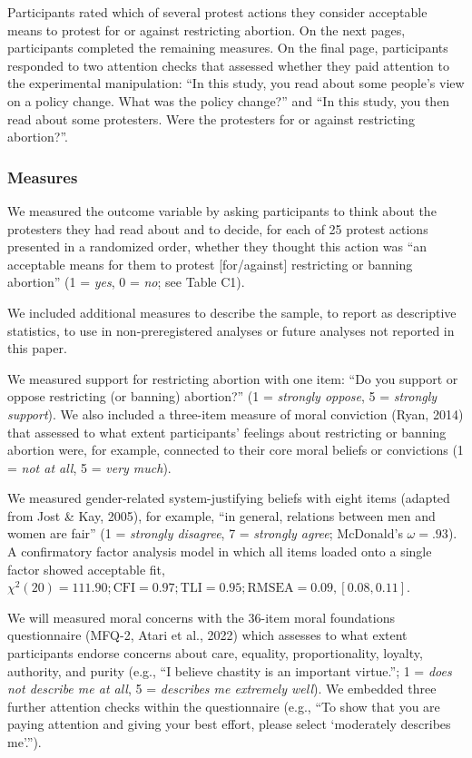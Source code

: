 \documentclass[twocolumn, 11pt, letterpaper]{article}
\begin{document}
\noindent Participants rated which of several protest actions they
consider acceptable means to protest for or against restricting
abortion. On the next pages, participants completed the remaining
measures. On the final page, participants responded to two attention
checks that assessed whether they paid attention to the experimental
manipulation: ``In this study, you read about some people's view on a
policy change. What was the policy change?'' and ``In this study, you
then read about some protesters. Were the protesters for or against
restricting abortion?''.

\hypertarget{measures-2}{%
\subsubsection{Measures}\label{measures-2}}

We measured the outcome variable by asking participants to think about
the protesters they had read about and to decide, for each of 25 protest
actions presented in a randomized order, whether they thought this
action was ``an acceptable means for them to protest {[}for/against{]}
restricting or banning abortion'' (1 = \emph{yes}, 0 = \emph{no}; see
Table C1).

We included additional measures to describe the sample, to report as
descriptive statistics, to use in non-preregistered analyses or future
analyses not reported in this paper.

We measured support for restricting abortion with one item: ``Do you
support or oppose restricting (or banning) abortion?'' (1 =
\emph{strongly oppose}, 5 = \emph{strongly support}). We also included a
three-item measure of moral conviction (Ryan, 2014) that assessed to
what extent participants' feelings about restricting or banning abortion
were, for example, connected to their core moral beliefs or convictions
(1 = \emph{not at all}, 5 = \emph{very much}).

We measured gender-related system-justifying beliefs with eight items
(adapted from Jost \& Kay, 2005), for example, ``in general, relations
between men and women are fair'' (1 = \emph{strongly disagree}, 7 =
\emph{strongly agree}; McDonald's \(\omega = .93\)). A confirmatory
factor analysis model in which all items loaded onto a single factor
showed acceptable fit,
\(\chi^2 (20) = 111.90; \text{CFI} = 0.97; \text{TLI} = 0.95; \text{RMSEA} = 0.09, [0.08, 0.11]\).

We will measured moral concerns with the 36-item moral foundations
questionnaire (MFQ-2, Atari et al., 2022) which assesses to what extent
participants endorse concerns about care, equality, proportionality,
loyalty, authority, and purity (e.g., ``I believe chastity is an
important virtue.''; 1 = \emph{does not describe me at all}, 5 =
\emph{describes me extremely well}). We embedded three further attention
checks within the questionnaire (e.g., ``To show that you are paying
attention and giving your best effort, please select `moderately
describes me'.'').
\end{document}
